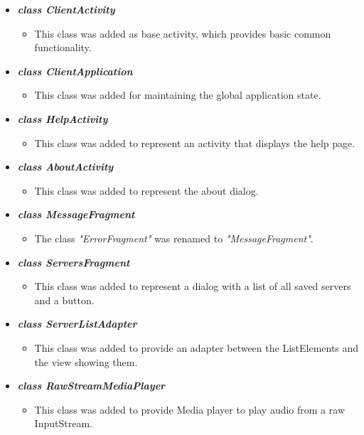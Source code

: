 \documentclass[a4paper,10pt]{scrartcl}
\begin{document}
\begin{itemize}
 \item \textit{\textbf{class ClientActivity}}
	\begin{itemize}
	 \item This class was added as base activity, which provides basic common functionality.
	\end{itemize}
	 
    \item \textbf{\textit{class ClientApplication}}
	\begin{itemize}
	 \item This class was added for maintaining the global application state.
	\end{itemize}
	
	\item \textbf{\textit{class HelpActivity}}
	\begin{itemize}
	 \item This class was added to represent an activity that displays the help page.
	\end{itemize}
	
	\item \textbf{\textit{class AboutActivity}}
	\begin{itemize}
	 \item This class was added to represent the about dialog.
	\end{itemize}
	
   \item \textbf{\textit{class MessageFragment}}
  \begin{itemize}
	 \item The class \textit{"ErrorFragment"} was renamed to \textit{"MessageFragment"}.
	\end{itemize}
	
	\item \textbf{\textit{class ServersFragment}}
	\begin{itemize}
	 \item This class was added to represent a dialog with a list of all saved servers and a button.
	\end{itemize}
	
	\item \textbf{\textit{class ServerListAdapter}}
	\begin{itemize}
	\item This class was added to provide an adapter between the ListElements and the view showing them.
	\end{itemize}
	
	\item \textbf{\textit{class RawStreamMediaPlayer}}
	\begin{itemize}
  \item This class was added to provide Media player to play audio from a raw InputStream.
	\end{itemize}
	

\end{itemize}
\end{document}
